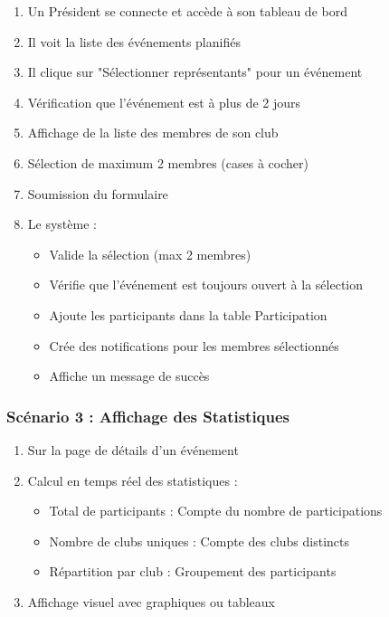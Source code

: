 \documentclass[12pt,a4paper]{article}
\begin{document}
\begin{enumerate}
    \item Un Président se connecte et accède à son tableau de bord
    \item Il voit la liste des événements planifiés
    \item Il clique sur "Sélectionner représentants" pour un événement
    \item Vérification que l'événement est à plus de 2 jours
    \item Affichage de la liste des membres de son club
    \item Sélection de maximum 2 membres (cases à cocher)
    \item Soumission du formulaire
    \item Le système :
    \begin{itemize}
        \item Valide la sélection (max 2 membres)
        \item Vérifie que l'événement est toujours ouvert à la sélection
        \item Ajoute les participants dans la table Participation
        \item Crée des notifications pour les membres sélectionnés
        \item Affiche un message de succès
    \end{itemize}
\end{enumerate}

\subsubsection{Scénario 3 : Affichage des Statistiques}

\begin{enumerate}
    \item Sur la page de détails d'un événement
    \item Calcul en temps réel des statistiques :
    \begin{itemize}
        \item Total de participants : Compte du nombre de participations
        \item Nombre de clubs uniques : Compte des clubs distincts
        \item Répartition par club : Groupement des participants
    \end{itemize}
    \item Affichage visuel avec graphiques ou tableaux
\end{enumerate}
\end{document}
